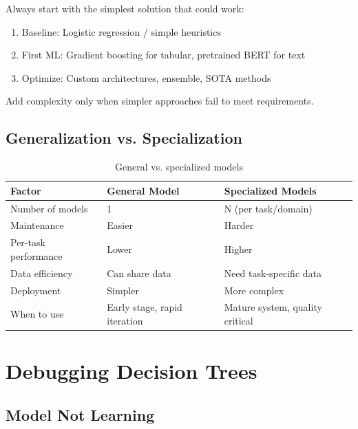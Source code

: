 \begin{keyinsight}
Always start with the simplest solution that could work:
\begin{enumerate}
    \item Baseline: Logistic regression / simple heuristics
    \item First ML: Gradient boosting for tabular, pretrained BERT for text
    \item Optimize: Custom architectures, ensemble, SOTA methods
\end{enumerate}
Add complexity only when simpler approaches fail to meet requirements.
\end{keyinsight}

\subsection{Generalization vs. Specialization}

\begin{table}[H]
\centering
\caption{General vs. specialized models}
\begin{tabularx}{\textwidth}{lXX}
\toprule
\textbf{Factor} & \textbf{General Model} & \textbf{Specialized Models} \\
\midrule
Number of models & 1 & N (per task/domain) \\
Maintenance & Easier & Harder \\
Per-task performance & Lower & Higher \\
Data efficiency & Can share data & Need task-specific data \\
Deployment & Simpler & More complex \\
When to use & Early stage, rapid iteration & Mature system, quality critical \\
\bottomrule
\end{tabularx}
\end{table}

\section{Debugging Decision Trees}
\label{sec:debugging_decisions}

\subsection{Model Not Learning}

